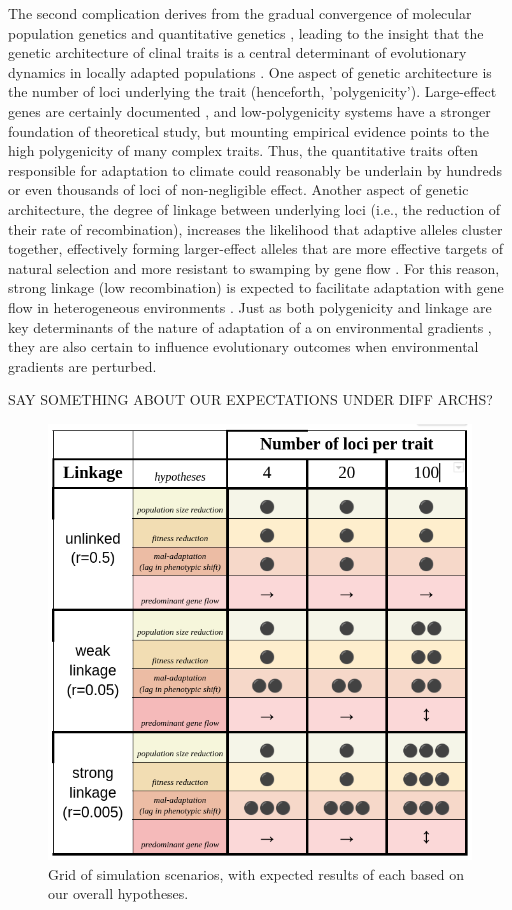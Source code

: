 \documentclass[9pt,twocolumn,twoside,lineno]{pnas-new}
\begin{document}
The second complication derives from the gradual convergence of molecular population genetics
and quantitative genetics \cite{barghi_polygenic,barton,pritchard_human_adaptation,pritchard_sweeps_alone},
leading to the insight that the genetic architecture of
clinal traits is a central determinant
of evolutionary dynamics in locally adapted populations \cite{yeaman_review}. 
One aspect of genetic architecture is the number of loci 
underlying the trait (henceforth, 'polygenicity'). 
Large-effect genes are certainly documented \cite{martin,rees},
and low-polygenicity systems have a stronger foundation
of theoretical study,
but mounting empirical evidence points to the high polygenicity 
of many complex traits\cite{boyle,rockman,savolainen,sella,barghi_polygenic}.
Thus, the quantitative traits often responsible for adaptation to climate could reasonably be 
underlain by hundreds or even thousands of loci of non-negligible effect.
Another aspect of genetic architecture, the degree of linkage between underlying loci
(i.e., the reduction of their rate of recombination),
increases the likelihood that adaptive alleles cluster together,
effectively forming larger-effect alleles that are more 
effective targets of natural selection and more resistant
to swamping by gene flow \cite{yeaman_whitlock}.
For this reason, strong linkage (low recombination)
is expected to facilitate
adaptation with gene flow in heterogeneous environments \cite{tigano}.
Just as both polygenicity and linkage
are key determinants of the nature of adaptation of a 
on environmental gradients \cite{barton,yeaman_whitlock,yeaman_review},
they are also certain to influence evolutionary
outcomes when environmental gradients are perturbed.

SAY SOMETHING ABOUT OUR EXPECTATIONS UNDER DIFF ARCHS?



\begin{figure}%
\centering
\includegraphics[width=.8\linewidth]{hypotheses}
\caption{Grid of simulation scenarios, with expected results of each based on our overall hypotheses.}
\label{tab:hypotheses}
\end{figure}
\end{document}
